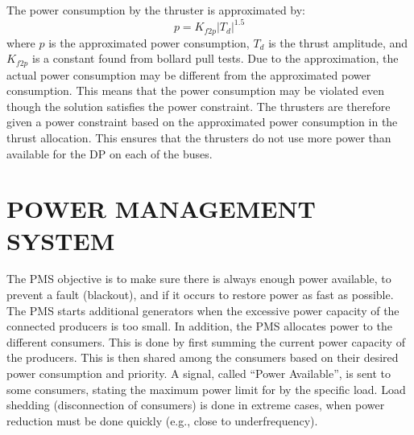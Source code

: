 \documentclass[twocolumn,10pt]{asme2e}
\begin{document}
%
%
%

The power consumption by the thruster is approximated by:
\begin{equation}
p = K_{f2p} |T_d|^{1.5}
\end{equation}
where $p$ is the approximated power consumption, $T_d$ is the thrust amplitude, and $K_{f2p}$ is a constant found from bollard pull tests.
Due to the approximation, the actual power consumption may be different from the approximated power consumption.
This means that the power consumption may be violated even though the solution satisfies the power constraint.
The thrusters are therefore given a power constraint based on the approximated power consumption in the thrust allocation.
This ensures that the thrusters do not use more power than available for the DP on each of the buses.

\section*{\uppercase{Power Management System}}
The PMS objective is to make sure there is always enough power available, to prevent a fault (blackout), and if it occurs to restore power as fast as possible.
The PMS starts additional generators when the excessive power capacity of the connected producers is too small.
In addition, the PMS allocates power to the different consumers.
This is done by first summing the current power capacity of the producers.
This is then shared among the consumers based on their desired power consumption and priority.
A signal, called ``Power Available'', is sent to some consumers, stating the maximum power limit for by the specific load.
Load shedding (disconnection of consumers) is done in extreme cases, when power reduction must be done quickly (e.g., close to underfrequency).
\end{document}
